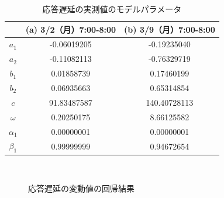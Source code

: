 \documentclass[technicalreport]{ieicej}
\begin{document}
\begin{table}[tb]
\centering
\caption{応答遅延の実測値のモデルパラメータ}
\label{norm-param}
\begin{tabular}{|c|c|c|}
\hline
&(a) 3/2（月）7:00-8:00&(b) 3/9（月）7:00-8:00\\
\hline
$a_1$&-0.06019205&-0.19235040\\
\hline
$a_2$&-0.11082113&-0.76329719\\
\hline
$b_1$&0.01858739&0.17460199\\
\hline
$b_2$&0.06935663&0.65314854\\
\hline
$c$&91.83487587&140.40728113\\
\hline
$\omega$&0.20250175&8.66125582\\
\hline
$\alpha_1$&0.00000001&0.00000001\\
\hline
$\beta_1$&0.99999999&0.94672654\\
\hline
\end{tabular}
\end{table}

\begin{figure}[tb]
\begin{center}
~
~
\caption{応答遅延の変動値の回帰結果}
\label{diff-reg}
\end{center}
\end{figure}
\end{document}
